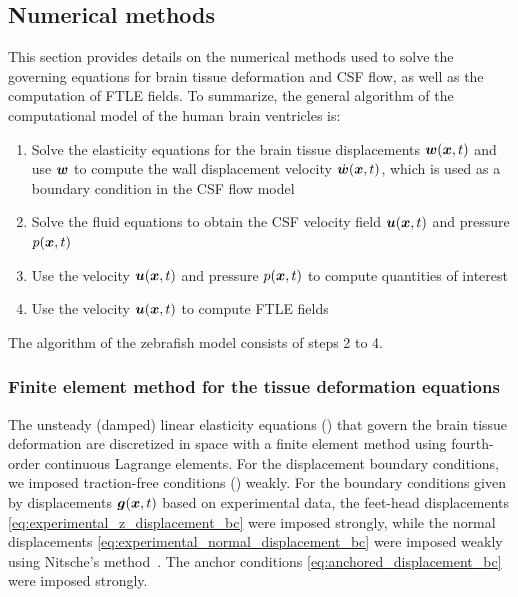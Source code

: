 \documentclass{template}
\begin{document}
\subsection{Numerical methods}
\label{sec:numerical_methods}

This section provides details on the numerical methods used
to solve the governing equations for brain tissue deformation and CSF flow,
as well as the computation of FTLE fields.
To summarize, the general algorithm of the computational model of the human
brain ventricles is:
\begin{enumerate}
    \item Solve the elasticity equations for the brain tissue displacements $\bm{w}(\bm{x}, t)$
    and use $\bm{w}$ to compute the wall displacement velocity $\dot{\bm{w}}(\bm{x}, t)$,
    which is used as a boundary condition in the CSF flow model
    \item Solve the fluid equations to obtain the CSF velocity field $\bm{u}(\bm{x}, t)$ and pressure $p(\bm{x}, t)$
    \item Use the velocity $\bm{u}(\bm{x}, t)$ and pressure $p(\bm{x}, t)$ to compute quantities of interest
    \item Use the velocity $\bm{u}(\bm{x}, t)$ to compute FTLE fields
\end{enumerate}
The algorithm of the zebrafish model consists of steps 2 to 4.

\subsubsection{Finite element method for the tissue deformation equations}
The unsteady (damped) linear elasticity equations ()
that govern the brain tissue deformation are discretized in space with a finite element method 
using fourth-order continuous Lagrange elements. For the displacement boundary conditions,
we imposed traction-free conditions ()
weakly. For the boundary conditions given by displacements $\bm{g}(\bm{x}, t)$ based on experimental data,
the feet-head displacements \eqref{eq:experimental_z_displacement_bc} were imposed strongly,
while the normal displacements \eqref{eq:experimental_normal_displacement_bc}
were imposed weakly using Nitsche's method~\cite{Nitsche1971UberSind,
benzaken2024constructing}. The anchor conditions \eqref{eq:anchored_displacement_bc}
were imposed strongly.
\end{document}
